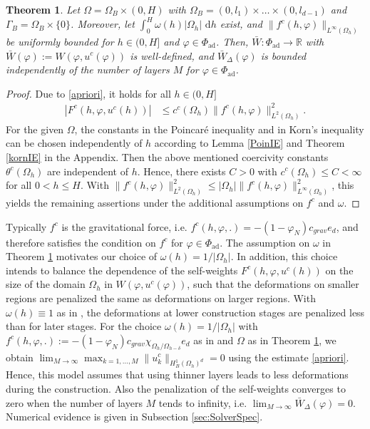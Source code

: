 \documentclass[a4paper,11pt]{article}
\newtheorem{theorem}{Theorem}%
\theoremstyle{remark}
\renewcommand{\dh}{\text{ d}h}
\newcommand{\Pad}{\Phi_{\text{ad}}}
\newcommand{\R}{\mathbb{R}}
\begin{document}
\begin{theorem}\label{Wc}
 Let $\Omega=\Omega_B\times (0,H)$ with $\Omega_B=(0,l_1)\times \ldots \times (0,l_{d-1})$
  and $ \Gamma_B=\Omega_B\times \{ 0 \}$.
Moreover, let
$\int_0^H\omega(h)|\Omega_h| \dh $ exist,
and $\| f^c(h,\varphi ) \|_{ L^\infty(\Omega_h)}$
be uniformly bounded for 
$h\in (0,H]$ and $\varphi \in \Pad$.
Then, $\bar W: \Pad \rightarrow \R $ with $ \bar W(\varphi):= W(\varphi, u^c(\varphi)) $ is well-defined,
and $\bar W_\Delta (\varphi)$ is bounded independently of the number of layers $M$
for $\varphi \in \Pad$.
\end{theorem}
\begin{proof}
  Due to \eqref{apriori}, it holds for all $h\in (0,H]$
\begin{align}
\label{Wapriori}
| F^c(h,\varphi, u^c(h))|
&\leq c^c(\Omega_h)
\| f^c(h,\varphi )  \|^2 _{L^2(\Omega_h)} .
\end{align}
For the given $\Omega$, the
constants in the Poincar\'e inequality and in Korn's inequality can be chosen independently of $h$ according to Lemma \ref{PoinIE} and Theorem \ref{kornIE} in the Appendix. 
Then the above mentioned coercivity 
constants $\theta^c(\Omega_h)$ are
independent of $h$.
Hence, there exists $C>0$ with $c^c(\Omega_h) \leq C<\infty $
for all $0<h\leq H$.
With $\| f^c(h,\varphi )  \|^2 _{L^2(\Omega_h)} \leq |\Omega_h| \| f^c(h,\varphi ) \|^2_{ L^\infty(\Omega_h)}$, this yields the remaining assertions under the additional assumptions on $f^c$ and $\omega$.
\end{proof}
%
Typically $f^c$ is the gravitational force, i.e. $f^c(h, \varphi,.)=-(1-\varphi_N)c_{grav}e_d$, and therefore satisfies the condition on $f^c$ for $\varphi \in \Pad$. 
The assumption on $\omega$
  in Theorem \ref{Wc}
  motivates our choice of $\omega(h)=1/|\Omega_h|$.
In addition, this choice intends to
balance
the dependence of  the self-weights
$F^c(h,\varphi, u^c(h))$
on the size of the domain $\Omega_h$
in 
$ W(\varphi, u^c(\varphi))  $, such that the
deformations on smaller regions are penalized
the same as deformations on larger regions.
With $\omega(h)\equiv 1$ as in \cite{AllaireOverview1,Allaire2}, the deformations at lower construction stages are penalized less than for later stages.
%
For the choice $\omega(h)=1/|\Omega_h|$
with $f^c(h,\varphi ,.):= -(1-\varphi_N)c_{grav} \chi_{\Omega_h/ \Omega_{h-\delta}}e_d$ as in \cite{WIAS}
and $\Omega$ as in Theorem \ref{Wc},
we obtain
$\lim_{M\to \infty} \max_{k=1,\ldots,M}\| u^c_k \| _{ H^1_B(\Omega_{h})^d} =0 $
using the estimate \eqref{apriori}.
Hence, this model assumes that using thinner layers
leads to less deformations during the construction.
Also the penalization of the self-weights converges to zero when the number of layers $M$ tends to infinity,
i.e. $\lim_{M\to\infty}\bar W_\Delta (\varphi)=0$.
Numerical evidence is given in Subsection \ref{sec:SolverSpec}.
%
\end{document}
